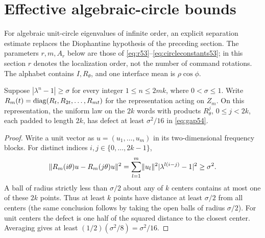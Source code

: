 \section{Effective algebraic-circle bounds}\label{sec:arithmetic53}
For algebraic unit-circle eigenvalues of infinite order, an explicit separation estimate replaces the Diophantine hypothesis of the preceding section. The parameters $r,m,A_r$ below are those of \eqref{eq:r53}--\eqref{eq:circleconstants53}; in this section $r$ denotes the localization order, not the number of command rotations. The alphabet contains $I,R_\theta$, and one interface mean is $\rho\cos\phi$.

\begin{lemma}\label{lem:separated53}
Suppose $|\lambda^n-1|\ge\sigma$ for every integer $1\le n\le2mk$, where $0<\sigma\le1$. Write $R_m(t)=\operatorname{diag}(R_t,R_{2t},\ldots,R_{mt})$ for the representation acting on $Z_m$. On this representation, the uniform law on the $2k$ words with products $R_\theta^j$, $0\le j<2k$, each padded to length $2k$, has defect at least $\sigma^2/16$ in \eqref{eq:gap54}.
\end{lemma}
\begin{proof}
Write a unit vector as $u=(u_1,\ldots,u_m)$ in its two-dimensional frequency blocks. For distinct indices $i,j\in\{0,\ldots,2k-1\}$,
\[
 \lVert R_m(i\theta)u-R_m(j\theta)u\rVert^2
 =\sum_{l=1}^m\lVert u_l\rVert^2|\lambda^{l(i-j)}-1|^2\ge\sigma^2.
\]
A ball of radius strictly less than $\sigma/2$ about any of $k$ centers contains at most one of these $2k$ points. Thus at least $k$ points have distance at least $\sigma/2$ from all centers (the same conclusion follows by taking the open balls of radius $\sigma/2$). For unit centers the defect is one half of the squared distance to the closest center. Averaging gives at least $(1/2)(\sigma^2/8)=\sigma^2/16$.
\end{proof}

